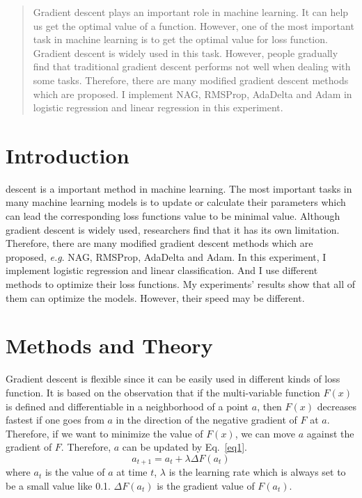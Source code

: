 \documentclass[journal, a4paper]{IEEEtran}
\begin{document}
\begin{abstract}
Gradient descent plays an important role in machine learning. It can help us get the optimal value of a function. However, one of the most important task in machine learning is to get the optimal value for loss function. Gradient descent is widely used in this task. However, people gradually find that traditional gradient descent performs not well when dealing with some tasks. Therefore, there are many modified gradient descent methods which are proposed. I implement NAG, RMSProp, AdaDelta and Adam in logistic regression and linear regression in this experiment.
\end{abstract}

\section{Introduction}
 descent is a important method in machine learning. The most important tasks in many machine learning models is to update or calculate their parameters which can lead the corresponding loss functions value to be minimal value. Although gradient descent is widely used, researchers find that it has its own limitation. Therefore, there are many modified gradient descent methods which are proposed, \emph{e.g}. NAG, RMSProp, AdaDelta and Adam. In this experiment, I implement logistic regression and linear classification. And I use different methods to optimize their loss functions. My experiments' results show that all of them can optimize the models. However, their speed may be different.

\section{Methods and Theory}
Gradient descent is flexible since it can be easily used in different kinds of loss function. It is based on the observation that if the multi-variable function $F(x)$ is defined and differentiable in a neighborhood of a point $a$, then $F(x)$ decreases fastest if one goes from $a$ in the direction of the negative gradient of $F$ at $a$. Therefore, if we want to minimize the value of $F(x)$, we can move $a$ against the gradient of $F$. Therefore, $a$ can be updated by Eq.~\eqref{eq1}.
\begin{equation}
a_{t+1}=a_{t} + \lambda \Delta F(a_{t}) \label{eq1}
\end{equation}
where $a_{t}$ is the value of $a$ at time $t$, $\lambda$ is the learning rate which is always set to be a small value like 0.1. $\Delta F(a_{t})$ is the gradient value of $F(a_{t})$.
\end{document}
